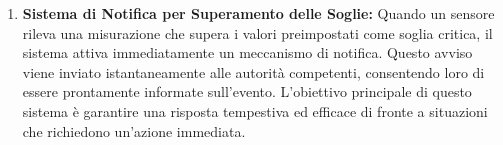 \begin{enumerate}
    \item \textbf{Sistema di Notifica per Superamento delle Soglie:} Quando un sensore rileva una misurazione che supera i valori preimpostati come soglia critica, il sistema attiva immediatamente un meccanismo di notifica. Questo avviso viene inviato istantaneamente alle autorità competenti, consentendo loro di essere prontamente informate sull'evento. L'obiettivo principale di questo sistema è garantire una risposta tempestiva ed efficace di fronte a situazioni che richiedono un'azione immediata.
\end{enumerate}
